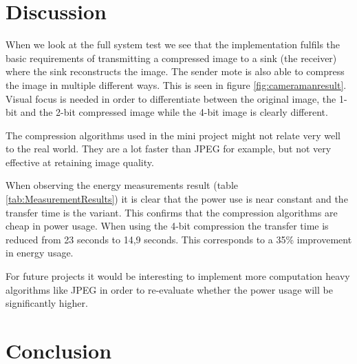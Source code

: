 \section{Discussion}
When we look at the full system test we see that the implementation fulfils the basic requirements of transmitting a compressed image to a sink (the receiver) where the sink reconstructs the image. The sender mote is also able to compress the image in multiple different ways. This is seen in figure \ref{fig:cameramanresult}. Visual focus is needed in order to differentiate between the original image, the 1-bit and the 2-bit compressed image while the 4-bit image is clearly different.

The compression algorithms used in the mini project might not relate very well to the real world. They are a lot faster than  JPEG for example, but not very effective at retaining image quality.

When observing the energy measurements result (table \ref{tab:MeasurementResults}) it is clear that the power use is near constant and the transfer time is the variant. This confirms that the compression algorithms are cheap in power usage. When using the 4-bit compression the transfer time is reduced from 23 seconds to 14,9 seconds. This corresponds to a 35\% improvement in energy usage.

For future projects it would be interesting to implement more computation heavy algorithms like JPEG in order to re-evaluate whether the power usage will be significantly higher.

\section{Conclusion}